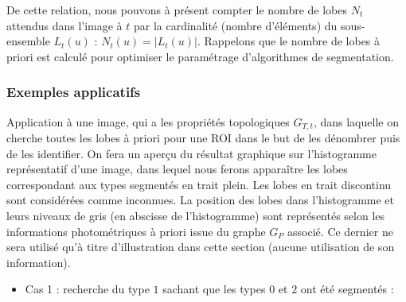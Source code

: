 	De cette relation, nous pouvons à présent compter le nombre de lobes $N_t$ attendus dans l'image à $t$ par la cardinalité (nombre d'éléments) du sous-ensemble $L_t(u)$ : $ N_t(u) = \left|{L_t(u)}\right|$. Rappelons que le nombre de lobes à priori est calculé pour optimiser le paramétrage d'algorithmes de segmentation.
	
		\subsubsection*{Exemples applicatifs}
	Application à une image, qui a les propriétés topologiques $G_{T,t}$, dans laquelle on cherche toutes les lobes à priori pour une ROI dans le but de les dénombrer puis de les identifier. On fera un aperçu du résultat graphique sur l'histogramme représentatif d'une image, dans lequel nous ferons apparaître les lobes correspondant aux types segmentés en trait plein. Les lobes en trait discontinu sont considérées comme inconnues. La position des lobes dans l'histogramme et leurs niveaux de gris (en abscisse de l'histogramme) sont représentés selon les informations photométriques à priori issue du graphe $G_P$ associé. Ce dernier ne sera utilisé qu'à titre d'illustration dans cette section (aucune utilisation de son information).\vspace{1em}

\begin{itemize}
\item Cas 1 : recherche du type $1$ sachant que les types $0$ et $2$ ont été segmentés :
\end{itemize}

